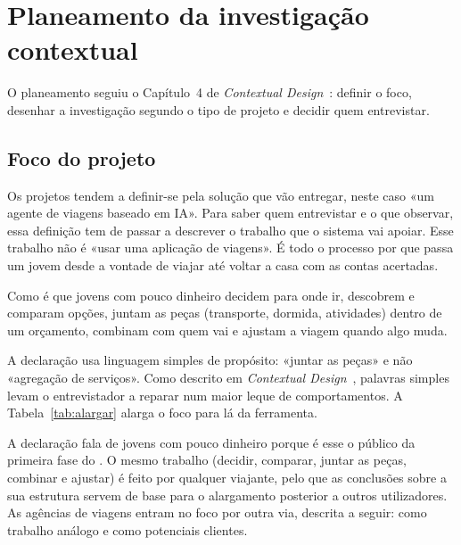 \section{Planeamento da investigação contextual}\label{sec:planeamento}

O planeamento seguiu o Capítulo~4 de \textit{Contextual Design}~\cite{beyer1998}: definir o foco,
desenhar a investigação segundo o tipo de projeto e decidir quem entrevistar.

\subsection{Foco do projeto}

Os projetos tendem a definir-se pela solução que vão entregar, neste caso «um agente de viagens baseado em IA». 
Para saber quem entrevistar e o que observar, essa definição tem de passar a descrever o trabalho que 
o sistema vai apoiar. Esse trabalho não é «usar uma aplicação de viagens». É todo o processo por que passa um 
jovem desde a vontade de viajar até voltar a casa com as contas acertadas.

\begin{foco}
Como é que jovens com pouco dinheiro decidem para onde ir, descobrem e comparam opções, juntam as 
peças (transporte, dormida, atividades) dentro de um orçamento, combinam com quem vai e ajustam a viagem 
quando algo muda.
\end{foco}

A declaração usa linguagem simples de propósito: «juntar as peças» e não «agregação de serviços». 
Como descrito em \textit{Contextual Design}~\cite{beyer1998}, palavras simples levam o entrevistador a reparar 
num maior leque de comportamentos. 
A Tabela~\ref{tab:alargar} alarga o foco para lá da ferramenta.

A declaração fala de jovens com pouco dinheiro porque é esse o público da primeira fase do \projeto. 
O mesmo trabalho (decidir, comparar, juntar as peças, combinar e ajustar) é feito por qualquer viajante, 
pelo que as conclusões sobre a sua estrutura servem de base para o alargamento posterior a outros utilizadores. 
As agências de viagens entram no foco por outra via, descrita a seguir: como trabalho análogo e como potenciais 
clientes.

